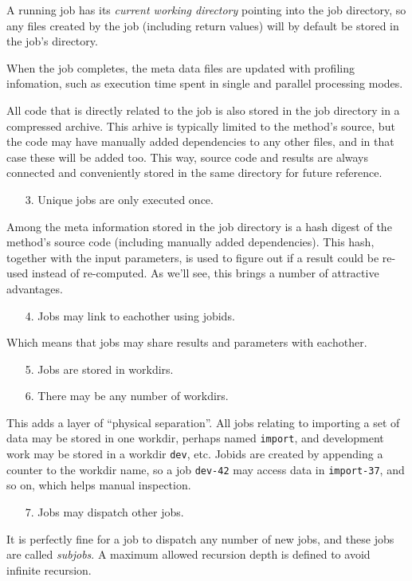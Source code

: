 \documentclass[a4paper]{article}
\begin{document}
A running job has its \textsl{current working directory} pointing into
the job directory, so any files created by the job (including return
values) will by default be stored in the job's directory.

When the job completes, the meta data files are updated with profiling
infomation, such as execution time spent in single and parallel
processing modes.

All code that is directly related to the job is also stored in the job
directory in a compressed archive.  This arhive is typically limited
to the method's source, but the code may have manually added
dependencies to any other files, and in that case these will be added
too.  This way, source code and results are always connected and
conveniently stored in the same directory for future reference.
\begin{itemize}
\item[3.]  Unique jobs are only executed once.
\end{itemize}
Among the meta information stored in the job directory is a hash
digest of the method's source code (including manually added
dependencies).  This hash, together with the input parameters, is used
to figure out if a result could be re-used instead of re-computed.  As
we'll see, this brings a number of attractive advantages.
\begin{itemize}
\item[4.]  Jobs may link to eachother using jobids.
\end{itemize}
Which means that jobs may share results and parameters with eachother.
\begin{itemize}
\item[5.]  Jobs are stored in workdirs.
\item[6.]  There may be any number of workdirs.
\end{itemize}
This adds a layer of ``physical separation''.  All jobs relating to
importing a set of data may be stored in one workdir, perhaps named
\texttt{import}, and development work may be stored in a workdir
\texttt{dev}, etc.  Jobids are created by appending a counter to the
workdir name, so a job \texttt{dev-42} may access data in
\texttt{import-37}, and so on, which helps manual inspection.
\begin{itemize}
\item[7.] Jobs may dispatch other jobs.
\end{itemize}
It is perfectly fine for a job to dispatch any number of new jobs, and
these jobs are called \textsl{subjobs}.  A maximum allowed recursion
depth is defined to avoid infinite recursion.
\clearpage
\end{document}
